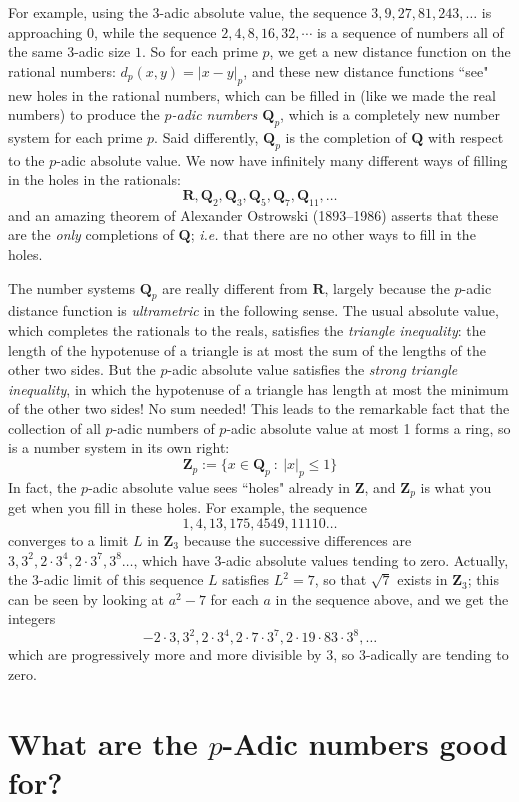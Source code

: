 \documentclass[11pt]{amsart}
\newcommand*{\R}{\ensuremath{\mathbf{R}}}
\newcommand*{\Z}{\ensuremath{\mathbf{Z}}}
\newcommand*{\Q}{\ensuremath{\mathbf{Q}}}
\theoremstyle{plain}
\theoremstyle{definition}
\theoremstyle{remark}
\numberwithin{theorem}{section}
\numberwithin{equation}{section}
\begin{document}
For example, using the $3$-adic absolute value, the sequence $3,9,27,81,243,\ldots$ is approaching 0,
while the sequence $2,4,8,16,32,\cdots$ is a sequence of numbers all of the same $3$-adic size $1$.
So for each prime $p$, we get a new distance function on the rational numbers: $d_p(x,y)=|x-y|_p$,
and these new distance functions ``see" new holes in the rational numbers, which can be filled in (like we made the real numbers)
to produce the {\em $p$-adic numbers $\Q_p$}, which is a completely new number system for each prime $p$.
Said differently, $\Q_p$ is the completion of $\Q$ with respect to the $p$-adic absolute value.
We now have infinitely many different ways of filling in the holes in the rationals:
$$
  \R, \Q_2, \Q_3, \Q_5, \Q_7, \Q_{11}, \ldots
$$
and an amazing theorem of Alexander Ostrowski (1893--1986) asserts that these are the {\em only} completions of $\Q$;
{\em i.e.} that there are no other ways to fill in the holes.

The number systems $\Q_p$ are really different from $\R$, largely because the $p$-adic distance function is {\em ultrametric}
in the following sense.
The usual absolute value, which completes the rationals to the reals, satisfies the {\em triangle inequality}: 
the length of the hypotenuse of a triangle is at most the sum of the lengths of the other two sides.  But the $p$-adic
absolute value satisfies the {\em strong triangle inequality}, in which the hypotenuse of a triangle has length at most the
minimum of the other two sides!  No sum needed!  This leads to the remarkable fact that the collection of all
$p$-adic numbers of $p$-adic absolute value at most 1 forms a ring, so is a number system in its own right:
$$
	\Z_p:=\{x\in \Q_p \ :\ |x|_p \le 1\}
$$
In fact, the $p$-adic absolute value sees ``holes" already in $\Z$, and $\Z_p$ is what you get when you fill in these holes.
For example, the sequence
$$
	1, 4, 13, 175, 4549, 11110\ldots
$$
converges to a limit $L$ in $\Z_3$ because the successive differences are $3,3^2,2\cdot 3^4, 2\cdot 3^7, 3^8\ldots$,
which have $3$-adic absolute values tending to zero.  Actually, the $3$-adic limit of this sequence $L$ satisfies $L^2 = 7$,
so that $\sqrt{7}$ exists in $\Z_3$; this can be seen by looking at $a^2 - 7$ for each $a$ in the sequence above, and we get the
integers
$$
	-2\cdot 3, 3^2, 2\cdot 3^4, 2\cdot 7\cdot 3^7,2\cdot19\cdot 83\cdot 3^8,\ldots
$$
which are progressively more and more divisible by $3$, so $3$-adically are tending to zero.


\section{What are the $p$-Adic numbers good for?}
\end{document}
